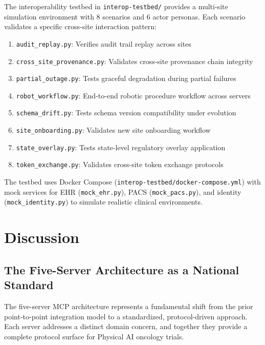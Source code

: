 \documentclass{article}
\begin{document}
The interoperability testbed in \texttt{interop-testbed/} provides a multi-site simulation environment with 8 scenarios and 6 actor personas. Each scenario validates a specific cross-site interaction pattern:

\begin{enumerate}[leftmargin=*]
\item \texttt{audit\_replay.py}: Verifies audit trail replay across sites
\item \texttt{cross\_site\_provenance.py}: Validates cross-site provenance chain integrity
\item \texttt{partial\_outage.py}: Tests graceful degradation during partial failures
\item \texttt{robot\_workflow.py}: End-to-end robotic procedure workflow across servers
\item \texttt{schema\_drift.py}: Tests schema version compatibility under evolution
\item \texttt{site\_onboarding.py}: Validates new site onboarding workflow
\item \texttt{state\_overlay.py}: Tests state-level regulatory overlay application
\item \texttt{token\_exchange.py}: Validates cross-site token exchange protocols
\end{enumerate}

The testbed uses Docker Compose (\texttt{interop-testbed/docker-compose.yml}) with mock services for EHR (\texttt{mock\_ehr.py}), PACS (\texttt{mock\_pacs.py}), and identity (\texttt{mock\_identity.py}) to simulate realistic clinical environments.

\section{Discussion}
\label{sec:discussion}

\subsection{The Five-Server Architecture as a National Standard}

The five-server MCP architecture represents a fundamental shift from the prior point-to-point integration model to a standardized, protocol-driven approach. Each server addresses a distinct domain concern, and together they provide a complete protocol surface for Physical AI oncology trials.
\end{document}
